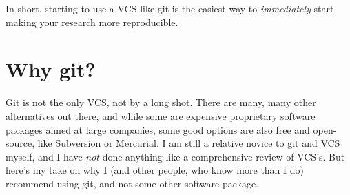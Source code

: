 \documentclass{article}
\begin{document}
In short, starting to use a VCS like git is the easiest way to \emph{immediately} start making your research more reproducible.
\section{Why git?}
\label{sec-4}

Git is not the only VCS, not by a long shot.  There are many, many other alternatives out there, and while some are expensive proprietary software packages aimed at large companies, some good options are also free and open-source, like Subversion or Mercurial.  I am still a relative novice to git and VCS myself, and I have \emph{not} done anything like a comprehensive review of VCS's.  But here's my take on why I (and other people, who know more than I do) recommend using git, and not some other software package.
\end{document}
